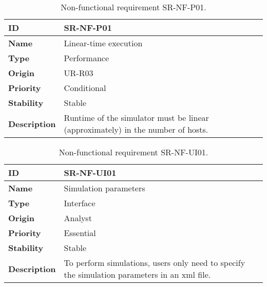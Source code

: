 \begin{center}
\begin{table*}[htbp]
\centering
\begin{tabular}{@{}p{2.5cm} p{9cm}@{}} 
\toprule
\textbf{ID} 				& SR-NF-P01\\
\midrule
\textbf{Name} 			& Linear-time execution \\
\midrule
\textbf{Type} 			& Performance \\
\midrule
\textbf{Origin} 			& UR-R03 \\
\midrule
\textbf{Priority}		& Conditional \\
\midrule
\textbf{Stability} 		& Stable \\
\midrule
\textbf{Description} 	& Runtime of the simulator must be linear (approximately) in the number of hosts. \\
\bottomrule
\end{tabular}
\caption{Non-functional requirement SR-NF-P01.}
\label{tab:srnfp01}
\end{table*}
\end{center}

\begin{center}
\begin{table*}[htbp]
\centering
\begin{tabular}{@{}p{2.5cm} p{9cm}@{}} 
\toprule
\textbf{ID} 				& SR-NF-UI01\\
\midrule
\textbf{Name} 			& Simulation parameters \\
\midrule
\textbf{Type} 			& Interface \\
\midrule
\textbf{Origin} 			& Analyst \\
\midrule
\textbf{Priority}		& Essential \\
\midrule
\textbf{Stability} 		& Stable \\
\midrule
\textbf{Description} 	& To perform simulations, users only need to specify the simulation parameters in an \gls{xml} file. \\
\bottomrule
\end{tabular}
\caption{Non-functional requirement SR-NF-UI01.}
\label{tab:srnfui01}
\end{table*}
\end{center}

